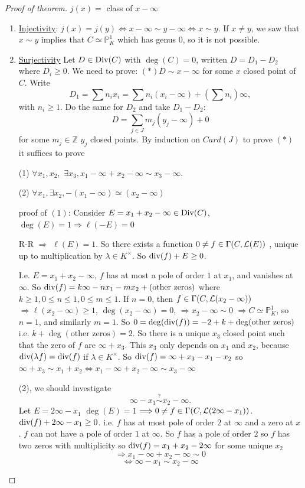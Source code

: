 \documentclass[11pt]{article}
\theoremstyle{definition}
\newcommand{\proj}{\mathbb P}
\newcommand{\intg}{\mathbb Z}
\newcommand{\call}{{\cal L}}
\renewcommand{\div}{\textnormal{div}}
\newcommand{\Div}{\textnormal{Div}}
\newcommand{\Lrta}{\Longrightarrow}
\newcommand{\Llrta}{\Longleftrightarrow}
\begin{document}
\begin{proof}[Proof of theorem]
$j(x)=$ class of $x-\infty$
\begin{enumerate}[label=(\arabic*)]
\item \underline{Injectivity}: $j(x)=j(y)\Llrta x-\infty\sim y-\infty\Llrta x\sim y$. If $x\neq y$, we saw that $x\sim y$ implies that $C\simeq \proj^1_K$ which has genus $0$, so it is not possible.
\item \underline{Surjectivity} Let $D\in \Div(C)$ with $\deg(C)=0$, written $D=D_1-D_2$ where $D_i\geq 0$. We need to prove: $(*)D\sim x-\infty$ for some $x$ closed point of $C$. Write 
$$
D_1=\sum n_i x_i=\sum n_i(x_i-\infty)+(\sum n_i)\infty,
$$
with $n_i\geq 1$.
Do  the same for $D_2$ and take $D_1-D_2:$
$$
D=\sum_{j\in J} m_j(y_j-\infty)+0
$$
for some $m_j\in \intg$ $y_j$ closed points. By induction on $Card(J)$ to prove $(*)$ it suffices to prove

(1) $\forall x_1,x_2,$ $\exists x_3, x_1-\infty+x_2-\infty\sim x_3-\infty$.

(2) $\forall x_1,\exists x_2, -(x_1-\infty)\simeq (x_2-\infty)$

proof of $(1)$: Consider $E=x_1+x_2-\infty\in \Div(C)$, $\deg(E)=1\Lrta \ell(-E)=0$

R-R $\Lrta$ $\ell(E)=1$. So there exists a function $0\neq f \in \Gamma(C,\call(E))$
, unique up to multiplication by $\lambda\in K^\times$. So $\div(f)+ E\geq 0$.

I.e. $E=x_1+x_2-\infty$, $f$ has at most a pole of order $1$ at $x_1$,  and vanishes at $\infty$. So $\div(f)=k\infty -n x_1-m x_2+(\text{other zeros})$ where $k\geq 1, 0\leq n\leq 1, 0\leq m\leq 1$. If $n=0$, then $f\in \Gamma(C,\call(x_2-\infty))$  
$\Lrta \ell(x_2-\infty)\geq 1$,
 $\deg(x_2-\infty)=0$, $\Lrta x_2-\infty\sim 0$ $\Lrta C\simeq \proj^1_K$, so $n=1$, and similarly $m=1$. So $0=\deg(\div(f))=-2+k+\deg(\text{other zeros})$ i.e. $k+\deg(\text{other zeros})=2$. So there is a unique $x_3$ closed point such that the zero of $f$ are $\infty +x_3$. This $x_3$ only depends on $x_1$ and  $x_2$, because $\div(\lambda f)= \div(f)$ if $\lambda \in K^\times$. So 
 $\div(f)=\infty+x_3-x_1-x_2$ so $\infty +x_3\sim x_1+x_2\Llrta x_1-\infty +x_2-\infty\sim x_3-\infty$

 (2),  we should investigate 
 $$
\infty -x_1\overset{?}{\sim} x_2-\infty.
 $$
 Let $E=2\infty -x_1$ $\deg(E)=1$ $\Lrta 0\neq f \in \Gamma(C,\call(2\infty-x_1))$. $\div(f)+2\infty -x_1\geq 0$. i.e. $f$ has at most pole of order $2$ at $\infty$ and a zero at $x$. $f$ can not have a pole of order $1$ at $\infty$. So $f$ has a pole of order $2$ so $f$ has two zeros with multiplicity so $\div(f)=x_1+x_2-2\infty$ for some unique $x_2$
 $$
\Lrta x_1-\infty +x_2-\infty\sim 0
 $$
 $$
\Llrta \infty -x_1\sim x_2-\infty
 $$
\end{enumerate}
\end{proof}
\end{document}
